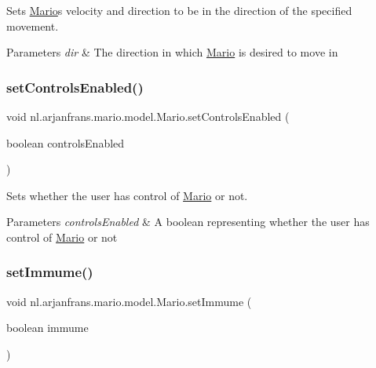 Sets \hyperlink{classnl_1_1arjanfrans_1_1mario_1_1model_1_1Mario}{Mario}\textquotesingle{}s velocity and direction to be in the direction of the specified movement. 


\begin{DoxyParams}{Parameters}
{\em dir} & The direction in which \hyperlink{classnl_1_1arjanfrans_1_1mario_1_1model_1_1Mario}{Mario} is desired to move in \\
\hline
\end{DoxyParams}
\mbox{\label{classnl_1_1arjanfrans_1_1mario_1_1model_1_1Mario_aa396b035c909e03417db5f201d894e2f}} 
\subsubsection{\texorpdfstring{set\+Controls\+Enabled()}{setControlsEnabled()}}
{\footnotesize\ttfamily void nl.\+arjanfrans.\+mario.\+model.\+Mario.\+set\+Controls\+Enabled (\begin{DoxyParamCaption}\item[{boolean}]{controls\+Enabled }\end{DoxyParamCaption})}



Sets whether the user has control of \hyperlink{classnl_1_1arjanfrans_1_1mario_1_1model_1_1Mario}{Mario} or not. 


\begin{DoxyParams}{Parameters}
{\em controls\+Enabled} & A boolean representing whether the user has control of \hyperlink{classnl_1_1arjanfrans_1_1mario_1_1model_1_1Mario}{Mario} or not \\
\hline
\end{DoxyParams}
\mbox{\label{classnl_1_1arjanfrans_1_1mario_1_1model_1_1Mario_a4ff385372dd5b42110839b1c3a92e0c4}} 
\subsubsection{\texorpdfstring{set\+Immume()}{setImmume()}}
{\footnotesize\ttfamily void nl.\+arjanfrans.\+mario.\+model.\+Mario.\+set\+Immume (\begin{DoxyParamCaption}\item[{boolean}]{immume }\end{DoxyParamCaption})}



